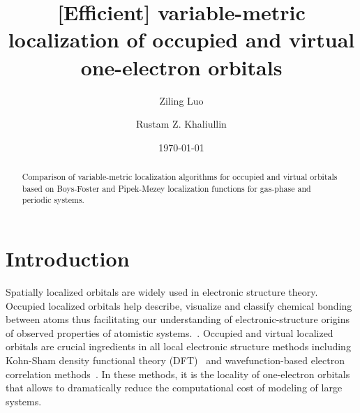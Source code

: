 \documentclass[aps,prl,reprint,amsmath,amssymb]{revtex4-1}
\begin{document}
\nocite{achemso-ctrl}



\title{
[Efficient] variable-metric localization of occupied and virtual one-electron orbitals
}

\author{Ziling Luo}
\author{Rustam Z. Khaliullin}

\date{\today}

\begin{abstract}
Comparison of variable-metric localization algorithms for occupied and virtual orbitals based on Boys-Foster and Pipek-Mezey localization functions for gas-phase and periodic systems.
\end{abstract}


\maketitle

\section{Introduction}
 
Spatially localized orbitals are widely used in electronic structure theory.
Occupied localized orbitals help describe, visualize and classify chemical bonding between atoms thus facilitating our understanding of electronic-structure origins of observed properties of atomistic systems.~\cite{boys1960construction, edmiston1963localized, pipek1989fast, niessen1972density, weinhold2012natural}.
Occupied and virtual localized orbitals are crucial ingredients in all local electronic structure methods including Kohn-Sham density functional theory (DFT)~\cite{goedecker1994efficient, bowler2012methods, zalesny2011linear, pulay1986orbital, saebo2001low, pisani2005local, hampel1996local, forner1997numerical} and wavefunction-based electron correlation methods~\cite{saebo1993local, schutz1999low, hetzer2000low, schutz2001low}.
In these methods, it is the locality of one-electron orbitals that allows to dramatically reduce the computational cost of modeling of large systems.

\end{document}
